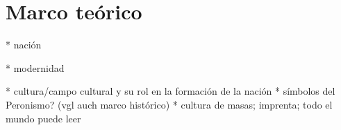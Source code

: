 \section{Marco teórico}

* nación

* modernidad

* cultura/campo cultural y su rol en la formación de la nación
  * símbolos del Peronismo? (vgl auch marco histórico)
  * cultura de masas; imprenta; todo el mundo puede leer
